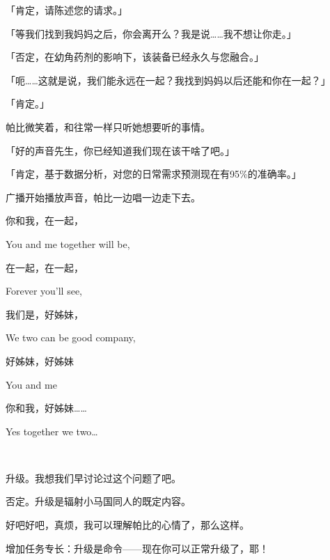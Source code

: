「{\mt 肯定，请陈述您的请求。}」

「等我们找到我妈妈之后，你会离开么？我是说……我不想让你走。」

「{\mt 否定，在幼角药剂的影响下，该装备已经永久与您融合。}」

「呃……这就是说，我们能永远在一起？我找到妈妈以后还能和你在一起？」

「{\mt 肯定。}」

帕比微笑着，和往常一样只听她想要听的事情。

「好的声音先生，你已经知道我们现在该干啥了吧。」

「{\mt 肯定，基于数据分析，对您的日常需求预测现在有95\%的准确率。}」

广播开始播放声音，帕比一边唱一边走下去。

\begin{song}
你和我，在一起，

You and me together will be,

\medskip

在一起，在一起，

Forever you'll see,

\medskip

我们是，好姊妹，


We two can be good company,

\medskip

好姊妹，好姊妹

You and me

\medskip

你和我，好姊妹……

Yes together we two\dots
\end{song}

~\vfill

\begin{note}
升级。我想我们早讨论过这个问题了吧。

否定。升级是辐射小马国同人的既定内容。

好吧好吧，真烦，我可以理解帕比的心情了，那么这样。

增加任务专长：升级是命令——现在你可以正常升级了，耶！
\end{note}





